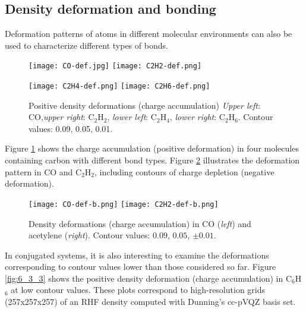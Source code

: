 \documentclass[10pt]{article}
\begin{document}
\subsection{Density deformation and bonding \label{sec:6.3}}

Deformation patterns of atoms in different molecular
environments can also be used to characterize different types of bonds.

\vspace*{5mm}
\begin{figure}[H]
\begin{center}
\texttt{[image: CO-def.jpg]}
\hspace*{5mm}
\texttt{[image: C2H2-def.png]}

\texttt{[image: C2H4-def.png]}
\hspace*{5mm}
\texttt{[image: C2H6-def.png]}
\end{center}
\caption[Positive density deformations (charge accumulation)]{ Positive density deformations (charge accumulation) 
{\it Upper left}: CO,{\it upper right}: C$_2$H$_2$, 
{\it lower left}: C$_2$H$_4$, {\it lower right}: C$_2$H$_6$.
Contour values: 0.09, 0.05, 0.01.
\label{fig:6_3_1}}
\end{figure}

Figure \ref{fig:6_3_1} shows the charge accumulation (positive deformation) in
four molecules containing carbon with different bond types. Figure
\ref{fig:6_3_2}
illustrates the deformation pattern in CO and C$_2$H$_2$, including contours
of charge depletion (negative deformation).


\begin{figure}[H]
\begin{center}
\texttt{[image: CO-def-b.png]}
\hspace*{5mm}
\texttt{[image: C2H2-def-b.png]}
\end{center}
\caption[Charge accumulation in CO]{ Density deformations (charge accumulation) in CO ({\it left}) and
acetylene ({\it right}). Contour values: $0.09$, $0.05$, $\pm 0.01$.
\label{fig:6_3_2}}
\end{figure}

In conjugated systems, it is also interesting to examine the deformations
corresponding to contour values lower than those considered so far. Figure
\ref{fig:6_3_3} shows the positive density deformation (charge accumulation) in
C$_6$H$_6$ at low contour values. These plots correspond to high-resolution
grids (257x257x257) of an RHF density computed with Dunning's cc-pVQZ basis
set.
\end{document}
